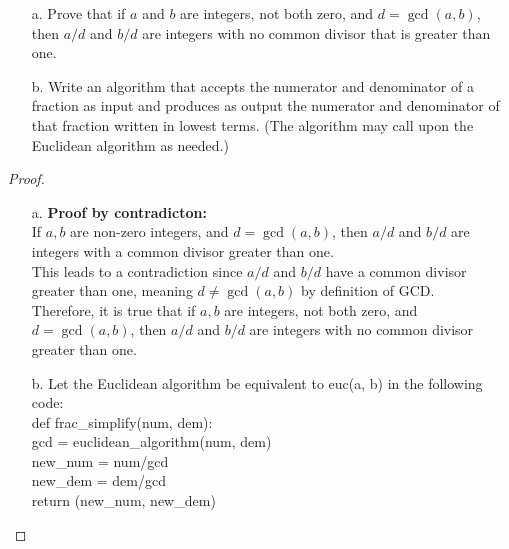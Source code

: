 \documentclass[name=Ojas\ Chaturvedi, emailid=oj.chaturvedi.2024, course=Capstone:\ Discrete\ Math, num=8, deadline={November\ 2,\ 2023}]{homework}
\begin{document}
\begin{enumerate}
    \item[a.] Prove that if $a$ and $b$ are integers, not both zero, and $d = \gcd(a,b)$, then $a/d$ and $b/d$ are integers with no common divisor that is greater than one.
    \item[b.] Write an algorithm that accepts the numerator and denominator of a fraction as input and produces as output the numerator and denominator of that fraction written in lowest terms. (The algorithm may call upon the Euclidean algorithm as needed.)
\end{enumerate}
\begin{proof}
    \begin{enumerate}
        \item[a.]
            \textbf{Proof by contradicton:} \\
            If $a, b$ are non-zero integers, and $d = \gcd(a, b)$, then $a/d$ and $b/d$ are integers with a common divisor greater than one. \\
            This leads to a contradiction since $a/d$ and $b/d$ have a common divisor greater than one, meaning $d\neq \gcd(a, b)$ by definition of GCD. \\
            Therefore, it is true that if $a, b$ are integers, not both zero, and $d = \gcd(a, b)$, then $a/d$ and $b/d$ are integers with no common divisor greater than one.
        \item[b.]
            Let the Euclidean algorithm be equivalent to euc(a, b) in the following code: \\
            def frac\_simplify(num, dem): \\
                gcd = euclidean\_algorithm(num, dem) \\
                new\_num = num/gcd \\
                new\_dem = dem/gcd \\
                return (new\_num, new\_dem)
    \end{enumerate}
\end{proof}
\end{document}
